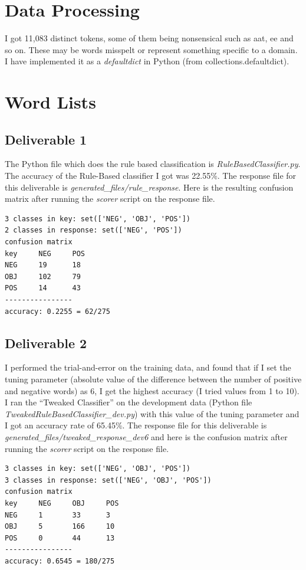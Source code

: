 \documentclass[10pt, letter]{article}
\begin{document}
\section{Data Processing}
I got 11,083 distinct tokens, some of them being nonsensical such as aat, ee and so on. These may be words misspelt or represent something specific to a domain. I have implemented it as a \textit{defaultdict} in Python (from collections.defaultdict).

\section{Word Lists}
\subsection*{Deliverable 1}
The Python file which does the rule based classification is \textit{RuleBasedClassifier.py}. The accuracy of the Rule-Based classifier I got was 22.55\%.
The response file for this deliverable is \textit{generated\_files/rule\_response}. Here is the resulting confusion matrix after running the \textit{scorer} script on the response file.
\begin{verbatim}
3 classes in key: set(['NEG', 'OBJ', 'POS'])
2 classes in response: set(['NEG', 'POS'])
confusion matrix
key     NEG     POS
NEG     19      18
OBJ     102     79
POS     14      43
----------------
accuracy: 0.2255 = 62/275
\end{verbatim}

\subsection*{Deliverable 2}
I performed the trial-and-error on the training data, and found that if I set the tuning parameter (absolute value of the difference between the number of positive and negative words) as $6$, I get the highest accuracy (I tried values from 1 to 10). I ran the ``Tweaked Classifier'' on the development data (Python file \textit{TweakedRuleBasedClassifier\_dev.py}) with this value of the tuning parameter and I got an accuracy rate of 65.45\%. The response file for this deliverable is \textit{generated\_files/tweaked\_response\_dev6} and here is the confusion matrix after running the \textit{scorer} script on the response file.
\begin{verbatim}
3 classes in key: set(['NEG', 'OBJ', 'POS'])
3 classes in response: set(['NEG', 'OBJ', 'POS'])
confusion matrix
key     NEG     OBJ     POS
NEG     1       33      3
OBJ     5       166     10
POS     0       44      13
----------------
accuracy: 0.6545 = 180/275
\end{verbatim}
\end{document}
